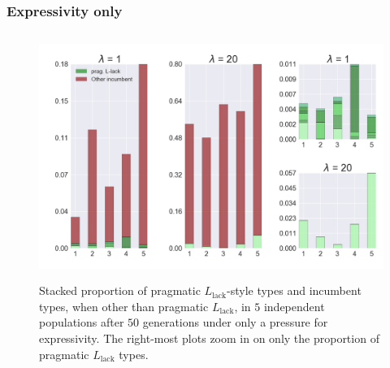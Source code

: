 \documentclass[a4paper]{article}
\newcommand{\mylang}[1]{\ensuremath{L_{\text{#1}}}\xspace} %
\newcommand{\Llack}{\mylang{lack}}
\begin{document}

\subsubsection{Expressivity only} 
\begin{figure}
\centering
\includegraphics[width=\textwidth,height=8cm, keepaspectratio]{./plots/fig1-onlyr}
\caption{Stacked proportion of pragmatic $\Llack$-style types and incumbent types, when other than pragmatic $\Llack$, in $5$ independent populations after $50$ generations under only a pressure for expressivity. The right-most plots zoom in on only the proportion of pragmatic $\Llack$ types.}
\label{fig:only-R}
\end{figure}
\end{document}
